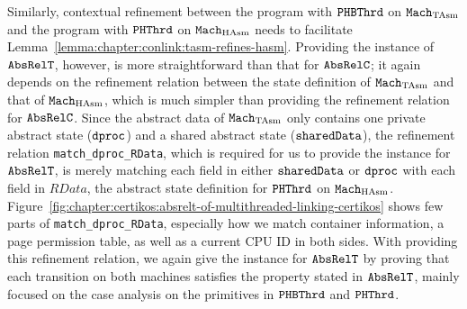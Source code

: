  Similarly, 
 contextual refinement between the program with ${{\mathrm{\texttt{PHBThrd}}}}$ on ${\mathrm{\texttt{Mach}}}_{\mathrm{TAsm}}$ and 
 the program with ${{\mathrm{\texttt{PHThrd}}}}$ on ${\mathrm{\texttt{Mach}}}_{\mathrm{HAsm}}$
 needs to facilitate Lemma~\ref{lemma:chapter:conlink:tasm-refines-hasm}.
Providing the instance of ${{\mathrm{\texttt{AbsRelT}}}}$, however, is more straightforward than that for  ${{\mathrm{\texttt{AbsRelC}}}}$;
it again depends on the refinement relation between the state definition of ${\mathrm{\texttt{Mach}}}_{\mathrm{TAsm}}$ and that of ${\mathrm{\texttt{Mach}}}_{\mathrm{HAsm}}$,
which is much simpler than providing the refinement relation for  ${{\mathrm{\texttt{AbsRelC}}}}$.
Since the abstract data of ${\mathrm{\texttt{Mach}}}_{\mathrm{TAsm}}$ only contains one private abstract state (${\mathrm{\texttt{dproc}}}$) and 
a shared abstract state (${\mathrm{\texttt{sharedData}}}$), 
the refinement relation \lstinline$match_dproc_RData$, which is required for us to provide the instance for ${{\mathrm{\texttt{AbsRelT}}}}$,
is merely matching each field in either ${\mathrm{\texttt{sharedData}}}$ or ${\mathrm{\texttt{dproc}}}$ with
each field in $RData$, the abstract state definition for ${{\mathrm{\texttt{PHThrd}}}}$ on ${\mathrm{\texttt{Mach}}}_{\mathrm{HAsm}}$.
Figure~\ref{fig:chapter:certikos:absrelt-of-multithreaded-linking-certikos} shows few parts of \lstinline$match_dproc_RData$, especially how we match container information, a page permission table, as well as a current CPU ID in both sides.
With providing this refinement relation,
we again give the instance for ${{\mathrm{\texttt{AbsRelT}}}}$ by proving 
that each transition on both machines satisfies the property stated in ${{\mathrm{\texttt{AbsRelT}}}}$,
mainly focused on the case analysis on the primitives in  ${{\mathrm{\texttt{PHBThrd}}}}$ and ${{\mathrm{\texttt{PHThrd}}}}$.



